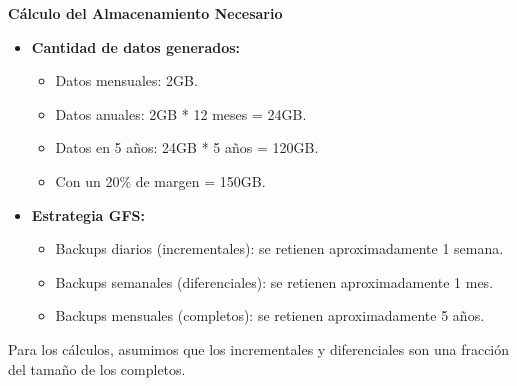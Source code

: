 \textbf{Cálculo del Almacenamiento Necesario}
\begin{itemize}
    \item \textbf{Cantidad de datos generados:}
    \begin{itemize}
        \item Datos mensuales: 2GB.
        \item Datos anuales: 2GB * 12 meses = 24GB.
        \item Datos en 5 años: 24GB * 5 años = 120GB.
        \item Con un 20\% de margen = 150GB.
    \end{itemize}

    \item \textbf{Estrategia GFS:}
    \begin{itemize}
        \item Backups diarios (incrementales): se retienen aproximadamente 1 semana.
        \item Backups semanales (diferenciales): se retienen aproximadamente 1 mes.
        \item Backups mensuales (completos): se retienen aproximadamente 5 años.
    \end{itemize}
\end{itemize}

Para los cálculos, asumimos que los incrementales y diferenciales son una fracción del tamaño de los completos.

